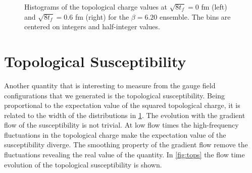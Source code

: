 \begin{figure}[hbt!]
\begin{subfigure}{0.45\textwidth}
    \end{subfigure}
    \caption{\footnotesize Histograms of the topological charge values at $\sqrt{8t_f} = 0$ fm (left) and $\sqrt{8t_f} = 0.6$ fm (right) for the $\beta=6.20$ ensemble. The bins are centered on integers and half-integer values.}
    \label{fig:topchist}
\end{figure} 

\section{Topological Susceptibility}
Another quantity that is interesting to measure from the gauge field configurations that we generated is the topological susceptibility. Being proportional to the expectation value of the squared topological charge, it is related to the width of the distributions in \cref{fig:topchist}. The evolution with the gradient flow of the susceptibility is not trivial. At low flow times the high-frequency fluctuations in the topological charge make the expectation value of the susceptibility diverge. The smoothing property of the gradient flow remove the fluctuations revealing the real value of the quantity. In \cref{fig:tops} the flow time evolution of the topological susceptibility is shown.

